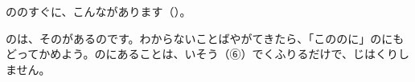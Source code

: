 
ののすぐに、こんながあります（）。
\par\vspace{1mm}
\noindent\begin{minipage}{\linewidth}\end{minipage}
のは、そのがあるのです。わからないことばやがてきたら、「こののに」のにもどってかめよう。のにあることは、いそう（⑥）でくふりるだけで、じはくりしません。

\clearpage

